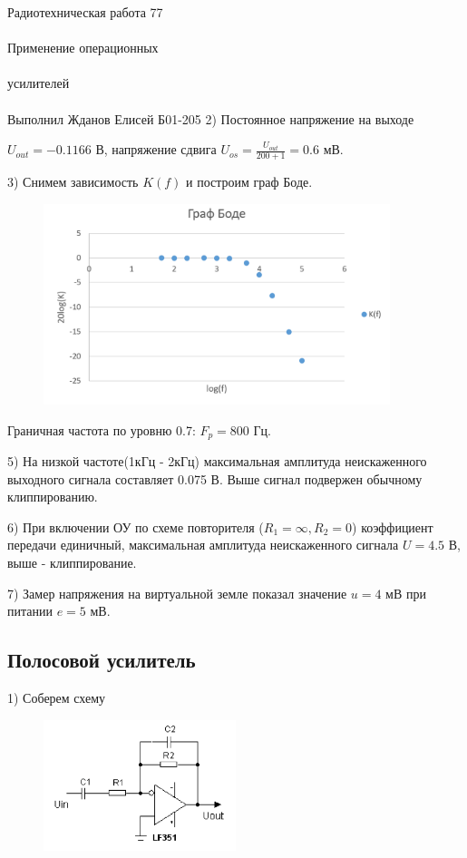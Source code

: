 \documentclass{astroedu-lab}
\begin{document}
\begin{problem}{\huge Радиотехническая работа 77\\\\Применение операционных\\\\усилителей\\\\Выполнил Жданов Елисей Б01-205}
2) Постоянное напряжение на выходе

$U_{out} = -0.1166$ В, напряжение сдвига $U_{os} = \frac{U_{out}}{200 + 1} = 0.6$ мВ.

3) Снимем зависимость $K(f)$ и построим граф Боде.

\begin{figure}[!h]
	\centering
	\includegraphics[width=0.9\textwidth]{bode.png}
	\label{fig:boiler}
\end{figure}

Граничная частота по уровню 0.7: $F_p = 800$ Гц.

5) На низкой частоте(1кГц - 2кГц) максимальная амплитуда неискаженного выходного сигнала составляет 0.075 В. Выше сигнал подвержен обычному клиппированию.

6) При включении ОУ по схеме повторителя ($R_1 = \infty, R_2 = 0$) коэффициент передачи единичный, максимальная амплитуда неискаженного сигнала $U = 4.5$ В, выше - клиппирование.

7) Замер напряжения на виртуальной земле показал значение $u = 4$ мВ при питании $e = 5$ мВ.

\subsection{Полосовой усилитель}

1) Соберем схему

\begin{figure}[!h]
	\centering
	\includegraphics[width=0.5\textwidth]{band.png}
	\label{fig:boiler}
\end{figure}


\end{problem}
\end{document}
